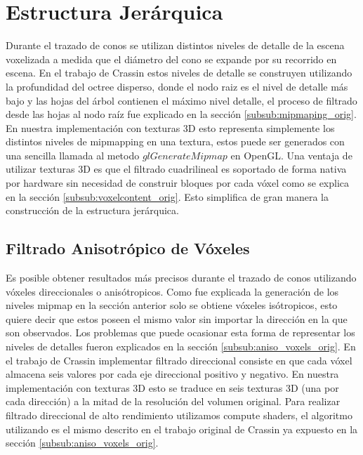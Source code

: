 \section{Estructura Jerárquica} %
\label{sec:estructura_jerarquica}
Durante el trazado de conos se utilizan distintos niveles de detalle de la escena voxelizada a medida que el diámetro del cono se expande por su recorrido en escena. En el trabajo de Crassin estos niveles de detalle se construyen utilizando la profundidad del octree disperso, donde el nodo raiz es el nivel de detalle más bajo y las hojas del árbol contienen el máximo nivel detalle, el proceso de filtrado desde las hojas al nodo raíz fue explicado en la sección \ref{subsub:mipmaping_orig}. En nuestra implementación con texturas 3D esto representa simplemente los distintos niveles de mipmapping en una textura, estos puede ser generados con una sencilla llamada al metodo $glGenerateMipmap$ en OpenGL. Una ventaja de utilizar texturas 3D es que el filtrado cuadrilineal es soportado de forma nativa por hardware sin necesidad de construir bloques por cada vóxel como se explica en la sección \ref{subsub:voxelcontent_orig}. Esto simplifica de gran manera la construcción de la estructura jerárquica.

\subsection{Filtrado Anisotrópico de Vóxeles} %
\label{sub:mipmapping_direccioanl}
Es posible obtener resultados más precisos durante el trazado de conos utilizando vóxeles direccionales o anisótropicos. Como fue explicada la generación de los niveles mipmap en la sección anterior solo se obtiene vóxeles isótropicos, esto quiere decir que estos poseen el mismo valor sin importar la dirección en la que son observados. Los problemas que puede ocasionar esta forma de representar los niveles de detalles fueron explicados en la sección \ref{subsub:aniso_voxels_orig}. En el trabajo de Crassin implementar filtrado direccional consiste en que cada vóxel almacena seis valores por cada eje direccional positivo y negativo. En nuestra implementación con texturas 3D esto se traduce en seis texturas 3D (una por cada dirección) a la mitad de la resolución del volumen original. Para realizar filtrado direccional de alto rendimiento utilizamos compute shaders, el algoritmo utilizando es el mismo descrito en el trabajo original de Crassin ya expuesto en la sección \ref{subsub:aniso_voxels_orig}.
